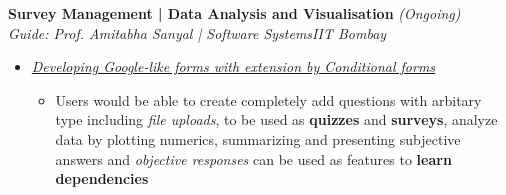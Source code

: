 \documentclass{article}
\begin{document}
\vspace{-12pt}
\textbf{Survey Management | Data Analysis and Visualisation} \hfill{\sl \small (Ongoing)}\\
{\it Guide: Prof. Amitabha Sanyal | Software Systems}\hfill{\sl \small IIT Bombay}\\
\vspace{-18pt}
\begin{itemize}[itemsep = -0.75 mm, leftmargin=*]
    \item \underline{\it Developing Google-like forms with extension by Conditional forms}
    \vspace{-7pt}
    \begin{itemize}[itemsep = -0.75 mm, leftmargin=*]
      \item Users would be able to create completely add questions with arbitary type including {\it file uploads}, to be used as {\bf quizzes} and {\bf surveys}, analyze data by plotting numerics, summarizing and presenting subjective answers and {\it objective responses} can be used as features to {\bf learn dependencies}
     
    \end{itemize}
    
\end{itemize}

\end{document}
